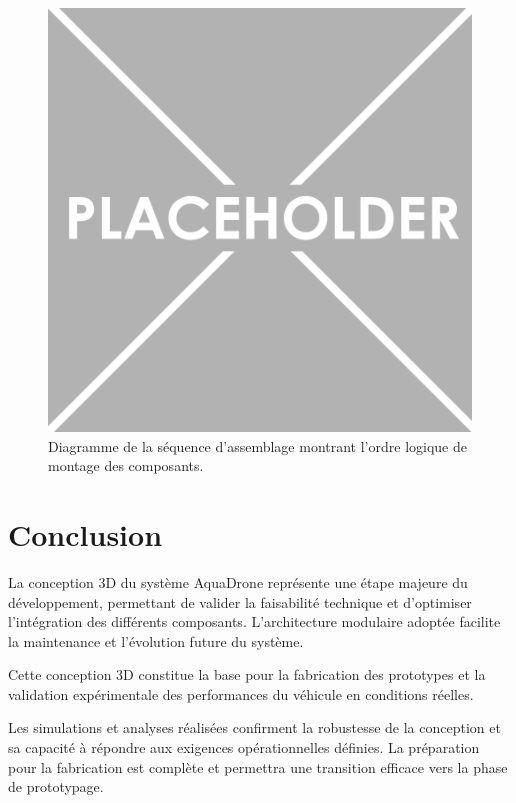 {\begin{figure}[!htpb]
    \centering
    \includegraphics[width=0.8\linewidth]{Figures/PezizaTuberosa.jpg}
    \caption[Séquence d'assemblage]{Diagramme de la séquence d'assemblage montrant l'ordre logique de montage des composants.}
    \label{fig:sequence-assemblage}
\end{figure}

\section{Conclusion}
La conception 3D du système AquaDrone représente une étape majeure du développement, permettant de valider la faisabilité technique et d'optimiser l'intégration des différents composants. L'architecture modulaire adoptée facilite la maintenance et l'évolution future du système.

\begin{block}[tip]
Cette conception 3D constitue la base pour la fabrication des prototypes et la validation expérimentale des performances du véhicule en conditions réelles.
\end{block}

Les simulations et analyses réalisées confirment la robustesse de la conception et sa capacité à répondre aux exigences opérationnelles définies. La préparation pour la fabrication est complète et permettra une transition efficace vers la phase de prototypage.

} 